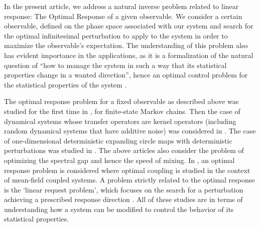 \documentclass{amsart}
\begin{document}
In the present article, we address a natural inverse problem related to linear response: The Optimal Response of a given observable. We consider a certain observable, defined on the phase space associated with our system and search for the optimal infinitesimal perturbation to apply to the system in order to maximize the observable's expectation.
The understanding of this problem also has evident importance in the applications, as it is a formalization of the natural question of ``how to manage the system in such a way that its statistical properties change in a wanted direction'', hence an optimal control problem for the statistical properties of the system \cite{AFG22,BLL20, HM10,GL20, M18}. 

The optimal response problem for a fixed observable as described above was studied for the first time in \cite{ADF18}, for finite-state Markov chains.
Then the case of dynamical systems  whose transfer operators are kernel operators (including random dynamical systems that have additive noise) was considered in \cite{AFG22}.
The case of one-dimensional deterministic expanding circle maps with deterministic perturbations was studied in \cite{FG23}.
The above articles also consider the problem of optimizing the spectral gap and hence the speed of mixing. In \cite{G22}, an optimal response problem is considered where optimal coupling is studied in the context of mean-field coupled systems.
A problem strictly   related to the optimal response is the `linear request problem', which focuses on the search for a perturbation achieving a prescribed response direction \cite{BLL20,GP17,GG19,M18,K18}.
All of these studies are  in terms of understanding how a system can be modified to control the behavior of its statistical properties.\\
\end{document}
